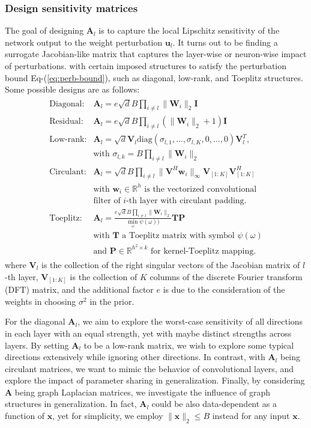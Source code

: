 \documentclass[journal]{IEEEtran} %
\def\eqref#1{Eq-(\ref{#1})}
\def\vu{{\bm{u}}}
\def\vw{{\bm{w}}}
\def\vx{{\bm{x}}}
\def\mA{{\bm{A}}}
\def\mI{{\bm{I}}}
\def\mP{{\bm{P}}}
\def\mT{{\bm{T}}}
\def\mV{{\bm{V}}}
\def\mW{{\bm{W}}}
\newcommand{\R}{\mathbb{R}}
\newcommand{\Norm}[1]{\|#1\|}
\begin{document}
\subsubsection{Design sensitivity matrices} The goal of designing $\mA_l$ is to capture the local Lipschitz sensitivity of the network output to the weight perturbation $\vu_l$. It turns out to be finding a surrogate Jacobian-like matrix that captures the layer-wise or neuron-wise impact of perturbations.
with certain imposed structures to satisfy the perturbation bound \eqref{eq:perb-bound}, such as diagonal, low-rank, and Toeplitz structures. Some possible designs are as follows:
\begin{align}
\begin{array}{ll}
     \text{Diagonal:} &  \mA_l =  e\sqrt{d}B \prod_{i\ne l} \Norm{\mW_i}_2  \mI \\
     \text{Residual:} &  \mA_l =  e\sqrt{d}B \prod_{i\ne l} (\Norm{\mW_i}_2+1)  \mI \\
     \text{Low-rank:} & \mA_l = \sqrt{d} \mV_l \mathrm{diag}(\sigma_{l,1},\dots,\sigma_{l,K},0,\dots,0)\mV_l^T, \\
     &\text{with } \sigma_{l,k} = B\prod_{i \ne l} \Norm{\mW_i}_2\\
     \text{Circulant:} & \mA_l = \sqrt{d} B \prod_{i\ne l} \Norm{\mV^H \vw_i}_{\infty} \mV_{[1:K]} \mV_{[1:K]}^H\\
     &\text{with $\vw_i \in \R^h$ is the vectorized convolutional}\\ &\text{filter of $i$-th layer with circulant padding.} \\
     \text{Toeplitz:} & {\mA}_l =  \frac{ e\sqrt{d}B  \prod_{i\ne l} \Norm{\mW_i}_2}{\min_{\omega}\psi(\omega))}\mT \mP\\
     &\text{with $\mT$ a Toeplitz matrix with symbol $\psi(\omega)$}\\ &\text{and $\mP \in \R^{h^2 \times k}$ for kernel-Toeplitz mapping.} 
\end{array}      
\end{align}
where $\mV_l$ is the collection of the right singular vectors of the Jacobian matrix of $l$-th layer, $\mV_{[1:K]}$ is the collection of $K$ columns of the discrete Fourier transform (DFT) matrix, and the additional factor $e$ is due to the consideration of the weights in choosing $\sigma^2$ in the prior.

For the diagonal $\mA_l$, we aim to explore the worst-case sensitivity of all directions in each layer with an equal strength, yet with maybe distinct strengths across layers. By setting $\mA_l$ to be a low-rank matrix, we wish to explore some typical directions extensively while ignoring other directions. In contrast, with $\mA_l$ being circulant matrices, we want to mimic the behavior of convolutional layers, and explore the impact of parameter sharing in generalization. Finally, by considering $\mA$ being graph Laplacian matrices, we investigate the influence of graph structures in generalization. In fact, $\mA_l$ could be also data-dependent as a function of $\vx$, yet for simplicity, we employ $\Norm{\vx}_2 \le B$ instead for any input $\vx$.
\end{document}
